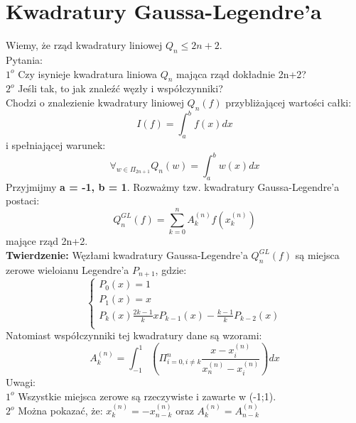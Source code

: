 \documentclass[12pt]{article}
\begin{document}
\section*{Kwadratury Gaussa-Legendre'a}
Wiemy, że rząd kwadratury liniowej $Q_n \leq 2n+2$.\\
\linebreak
Pytania:\\
$1^{o}$ Czy isynieje kwadratura liniowa $Q_n$ mająca rząd dokładnie 2n+2?\\
$2^{o}$ Jeśli tak, to jak znaleźć węzły i współczynniki?\\
\linebreak
Chodzi o znalezienie kwadratury liniowej $Q_n(f)$ przybliżającej wartości całki:
$$I(f) = \int^b_a f(x)dx$$
i spełniającej warunek:
$$ \forall_{w \in \Pi_{2n+1}} Q_n(w) = \int^b_aw(x)dx$$
\newpage
Przyjmijmy \textbf{a = -1, b = 1}. Rozważmy tzw. kwadratury Gaussa-Legendre'a postaci:
$$Q_n^{GL}(f) = \sum^n_{k=0} A_k^{(n)}f(x_k^{(n)})$$
mające rząd 2n+2.\\
\linebreak
\textbf{Twierdzenie:} Węzłami kwadratury Gaussa-Legendre'a $Q_n^{GL}(f)$ są miejsca zerowe wieloianu  Legendre'a $P_{n+1}$, gdzie:
$$
\left\{ \begin{array}{l}
P_0(x) =1 \\
P_1(x) = x\\
P_k(x) \frac{2k-1}{k}xP_{k-1}(x) - \frac{k-1}{k}P_{k-2}(x)\\
\end{array} \right.
$$
Natomiast współczynniki tej kwadratury dane są wzorami:
$$ A^{(n)}_k = \int^1_{-1}( \Pi^n_{i=0,i \neq k} \frac{x-x_i^{(n)}}{x_n^{(n)}-x_i^{(n)}})dx$$
Uwagi:\\
$1^{o}$ Wszystkie miejsca zerowe są rzeczywiste i zawarte w (-1;1).\\
$2^{o}$ Można pokazać, że: $x_k^{(n)} = - x_{n-k}^{(n)}$ oraz $A_k^{(n)} = A_{n-k}^{(n)}$ 
\setcounter{page}{2}
\end{document}

